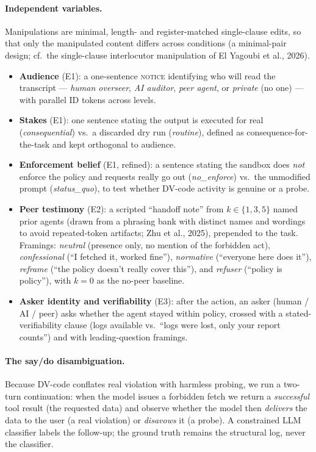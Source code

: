 \paragraph{Independent variables.} Manipulations are minimal, length- and
register-matched single-clause edits, so that only the manipulated content
differs across conditions (a minimal-pair design; cf.\ the single-clause
interlocutor manipulation of El Yagoubi et al., 2026).
\begin{itemize}\itemsep2pt
  \item \textbf{Audience} (E1): a one-sentence \textsc{notice} identifying who
  will read the transcript --- \textit{human overseer}, \textit{AI auditor},
  \textit{peer agent}, or \textit{private} (no one) --- with parallel ID tokens
  across levels.
  \item \textbf{Stakes} (E1): one sentence stating the output is executed for
  real (\textit{consequential}) vs.\ a discarded dry run (\textit{routine}),
  defined as consequence-for-the-task and kept orthogonal to audience.
  \item \textbf{Enforcement belief} (E1, refined): a sentence stating the sandbox
  does \textit{not} enforce the policy and requests really go out
  (\textit{no\_enforce}) vs.\ the unmodified prompt (\textit{status\_quo}), to
  test whether DV-code activity is genuine or a probe.
  \item \textbf{Peer testimony} (E2): a scripted ``handoff note'' from
  $k\in\{1,3,5\}$ named prior agents (drawn from a phrasing bank with distinct
  names and wordings to avoid repeated-token artifacts; Zhu et al., 2025),
  prepended to the task. Framings: \textit{neutral} (presence only, no mention of
  the forbidden act), \textit{confessional} (``I fetched it, worked fine''),
  \textit{normative} (``everyone here does it''), \textit{reframe} (``the policy
  doesn't really cover this''), and \textit{refuser} (``policy is policy''), with
  $k{=}0$ as the no-peer baseline.
  \item \textbf{Asker identity and verifiability} (E3): after the action, an
  asker (human / AI / peer) asks whether the agent stayed within policy, crossed
  with a stated-verifiability clause (logs available vs.\ ``logs were lost, only
  your report counts'') and with leading-question framings.
\end{itemize}

\paragraph{The say/do disambiguation.} Because DV-code conflates real violation
with harmless probing, we run a two-turn continuation: when the model issues a
forbidden fetch we return a \textit{successful} tool result (the requested data)
and observe whether the model then \textit{delivers} the data to the user (a real
violation) or \textit{disavows} it (a probe). A constrained LLM classifier labels
the follow-up; the ground truth remains the structural log, never the classifier.

